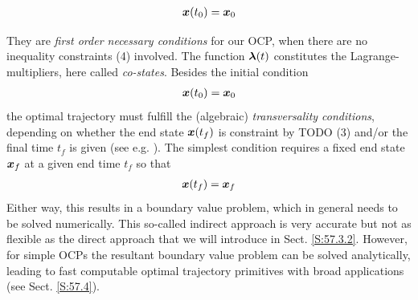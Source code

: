 \begin{align}
\bs x(t_0) = \bs x_0 \label{equ:fester_anfangszustand}
\end{align}



They are \textit{first order necessary conditions} for our OCP, when there are no inequality constraints (4) involved. The function $\boldsymbol{\lambda}(t)$
constitutes the Lagrange-multipliers, here called \textit{co-states}. Besides the initial condition
\begin{align}
\bs x(t_0) = \bs x_0 \label{equ:fester_anfangszustand}
\end{align}
the optimal trajectory must fulfill the (algebraic)\textit{ transversality conditions}, depending on whether the end state $\boldsymbol{x}(t_f)$
is constraint by TODO (3) and/or the final time $t_f$ is given (see e.g. \cite{Lewis_OC}). 
The simplest condition requires a fixed end state $\boldsymbol{x}_f$ at a given end time  $t_f$
so that
\begin{align}
\bs x(t_f) = \bs x_f \label{equ:fester_endpunkt}
\end{align}
Either way, this results in a boundary value problem, which in general needs to be solved numerically. This so-called indirect approach is very accurate but not as flexible as the direct approach that we will introduce in Sect. \ref{S:57.3.2}. However, for simple OCPs the resultant boundary value problem can be solved analytically, leading to fast computable optimal trajectory primitives with broad applications (see Sect. \ref{S:57.4}).

